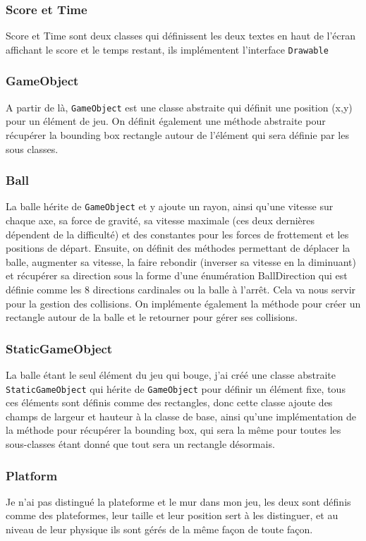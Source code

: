 \documentclass{article}
\begin{document}
\subsubsection{Score et Time}
Score et Time sont deux classes qui définissent les deux textes en haut de l'écran affichant le score et le temps restant, ils implémentent l'interface \verb+Drawable+
\subsubsection{GameObject}
A partir de là, \verb+GameObject+ est une classe abstraite qui définit une position (x,y) pour un élément de jeu. On définit également une méthode abstraite pour récupérer la bounding box rectangle autour de l'élément qui sera définie par les sous classes.
\subsubsection{Ball}
La balle hérite de \verb+GameObject+ et y ajoute un rayon, ainsi qu'une vitesse sur chaque axe, sa force de gravité, sa vitesse maximale (ces deux dernières dépendent de la difficulté) et des constantes pour les forces de frottement et les positions de départ. Ensuite, on définit des méthodes permettant de déplacer la balle, augmenter sa vitesse, la faire rebondir (inverser sa vitesse en la diminuant) et récupérer sa direction sous la forme d'une énumération BallDirection qui est définie comme les 8 directions cardinales ou la balle à l'arrêt. Cela va nous servir pour la gestion des collisions. On implémente également la méthode pour créer un rectangle autour de la balle et le retourner pour gérer ses collisions.
\subsubsection{StaticGameObject}
La balle étant le seul élément du jeu qui bouge, j'ai créé une classe abstraite \verb+StaticGameObject+ qui hérite de \verb+GameObject+ pour définir un élément fixe, tous ces éléments sont définis comme des rectangles, donc cette classe ajoute des champs de largeur et hauteur à la classe de base, ainsi qu'une implémentation de la méthode pour récupérer la bounding box, qui sera la même pour toutes les sous-classes étant donné que tout sera un rectangle désormais.
\subsubsection{Platform}
Je n'ai pas distingué la plateforme et le mur dans mon jeu, les deux sont définis comme des plateformes, leur taille et leur position sert à les distinguer, et au niveau de leur physique ils sont gérés de la même façon de toute façon.
\end{document}
